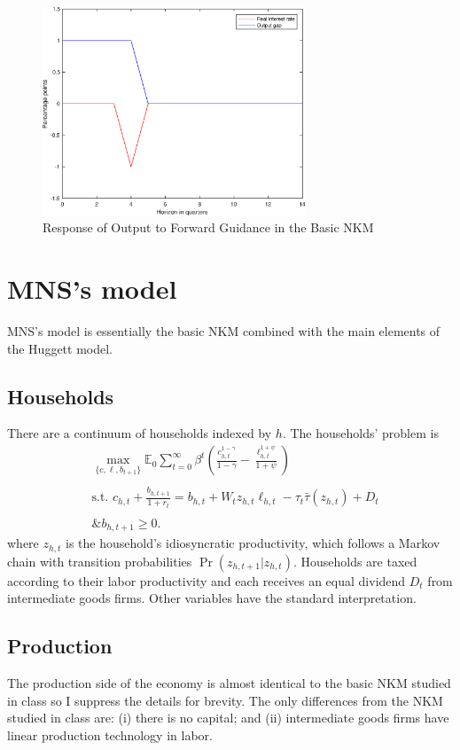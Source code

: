 \documentclass[12pt]{article}
\newcommand{\E}{\mathbb{E}}
\begin{document}
\begin{figure}[htpb!]
 \centering
 	\caption{Response of Output to Forward Guidance in the Basic NKM}
        \includegraphics[width=0.7\textwidth]{IR_1_R.eps}
\end{figure}



\section{MNS's model}
MNS's model is essentially the basic NKM combined with the main elements of the Huggett model.

\subsection{Households}
There are a continuum of households indexed by $h$. The households' problem is
\begin{align*}
&\max_{\{c,\ell, b_{t+1}\}} \E_0\sum_{t=0}^\infty \beta^t \left(\frac{c_{h,t}^{1-\gamma}}{1-\gamma} - \frac{\ell_{h,t}^{1+\psi}}{1+\psi}\right)\\
\\
&\text{s.t. } c_{h,t} + \frac{b_{h,t+1}}{1+r_t} = b_{h,t} + W_tz_{h,t}\ell_{h,t} - \tau_t\bar\tau(z_{h,t}) +D_t\\
\\
&\text{\& } b_{h,t+1} \geq 0.
\end{align*}
where $z_{h,t}$ is the household's idiosyncratic productivity, which follows a Markov chain with transition probabilities $\Pr(z_{h,t+1}|z_{h,t})$. Households are taxed according to their labor productivity and each receives an equal dividend $D_t$ from intermediate goods firms. Other variables have the standard interpretation.

\subsection{Production}
The production side of the economy is almost identical to the basic NKM studied in class so I suppress the details for brevity. The only differences from the NKM studied in class are: (i) there is no capital; and (ii) intermediate goods firms have linear production technology in labor.
\end{document}
